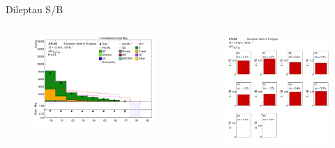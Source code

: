 \begin{frame}{Dileptau S/B}
    \begin{columns}
        \begin{column}{0.5\textwidth}
            \begin{figure}
                \centering
                \includegraphics[width=\textwidth]{lephad_cutflow}
            \end{figure}
        \end{column}
        \begin{column}{0.5\textwidth}
            \begin{figure}
                \centering
                \includegraphics[width=\textwidth]{NN_sb}
            \end{figure}
        \end{column}
    \end{columns}
\end{frame}

